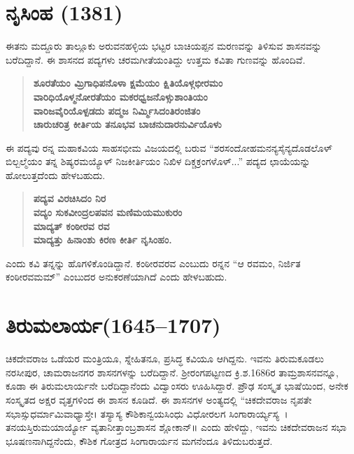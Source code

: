 \section{ನೃಸಿಂಹ (1381)}

ಈತನು ಮದ್ದೂರು ತಾಲ್ಲೂಕು ಅರುವನಹಳ್ಳಿಯ ಭಟ್ಟರ ಬಾಚಿಯಪ್ಪನ ಮರಣವನ್ನು ತಿಳಿಸುವ ಶಾಸನವನ್ನು ಬರೆದಿದ್ದಾನೆ. ಈ ಶಾಸನದ ಪದ್ಯಗಳು ಚರಮಗೀತೆಯಂತಿದ್ದು ಉತ್ತಮ ಕವಿತಾ ಗುಣವನ್ನು ಹೊಂದಿವೆ.

\begin{verse}
\textbf{ಶೂರತೆಯಂ ಮ್ರಿಗಾಧಿಪನೊಳಾ ಕ್ಷಮೆಯಂ ಕ್ಷಿತಿಯೊಳ್ಗಭೀರಮಂ} \\\textbf{ವಾರಿಧಿಯೊಳ್ಮನೋರತೆಯಂ ಮಕರಧ್ವಜನೊಳ್ಸುಶಾಂತಿಯಂ} \\\textbf{ವಾರಿಜವೈರಿಯೊಳ್ಪಡದು ಪದ್ಮಜ ನಿರ್ಮ್ಮಿಸಿದಂತಿರಂಜಿತಂ} \\\textbf{ಚಾರುಚರಿತ್ರ ಕೀರ್ತಿಯ ತನೂಭವ ಬಾಚನುದಾರನುರ್ವಿಯೊಳು}
\end{verse}

ಈ ಪದ್ಯವು ರನ್ನ ಮಹಾಕವಿಯ ಸಾಹಸಭೀಮ ವಿಜಯದಲ್ಲಿ ಬರುವ “ಶರಸಂದೋಹಮನನ್ಯಸೈನ್ಯದೊಡಲೊಳ್​ ಬಿಲ್ಬಲ್ಮೆಯಂ ತನ್ನ ಶಿಷ್ಯರಮಯ್ಯೊಳ್​ ನಿಜಕೀರ್ತಿಯಂ ನಿಖಿಳ ದಿಕ್ಚಕ್ರಂಗಳೊಳ್​...” ಪದ್ಯದ ಛಾಯೆಯನ್ನು ಹೋಲುತ್ತದೆಂದು ಹೇಳಬಹುದು.

\begin{verse}
\textbf{ಪದ್ಯವ ವಿರಚಿಸಿದಂ ನಿರ} \\\textbf{ವದ್ಯಂ ಸುಕವೀಂದ್ರಲಪವನ ಮಣಿಮಯಮುಕುರಂ} \\\textbf{ಮಾದ್ಯತ್​ ಕಂಠೀರವ ರವ} \\\textbf{ಮಾದ್ಯತ್ತು ಹಿನಾಂಶು ಕಿರಣ ಕೀರ್ತಿ ನೃಸಿಂಹಂ.}
\end{verse}

ಎಂದು ಕವಿ ತನ್ನನ್ನು ಹೊಗಳಿಕೊಂಡಿದ್ದಾನೆ. ಕಂಠೀರವರವ ಎಂಬುದು ರನ್ನನ “ಆ ರವಮಂ, ನಿರ್ಜಿತ ಕಂಠೀರವಮಮ್” ಎಂಬುದರ ಅನುಕರಣೆಯಾಗಿದೆ ಎಂದು ಹೇಳಬಹುದು.


\section{ತಿರುಮಲಾರ್ಯ(1645–1707)}

ಚಿಕದೇವರಾಜ ಒಡೆಯರ ಮಂತ್ರಿಯೂ, ಸ್ನೇಹಿತನೂ, ಪ್ರಸಿದ್ಧ ಕವಿಯೂ ಆಗಿದ್ದನು. ಇವನು ತಿರುಮಕೂಡಲು ನರಸೀಪುರ, ಚಾಮರಾಜನಗರ ಶಾಸನಗಳನ್ನು ಬರೆದಿದ್ದಾನೆ. ಶ‍್ರೀರಂಗಪಟ್ಟಣದ ಕ್ರಿ.ಶ.1686ರ ತಾಮ್ರಶಾಸನವನ್ನೂ, ಕೂಡಾ ಈ ತಿರುಮಲಾರ್ಯನೇ ಬರೆದಿದ್ದಾನೆಂದು ವಿದ್ವಾಂಸರು ಊಹಿಸಿದ್ದಾರೆ. ಪ್ರೌಢ ಸಂಸ್ಕೃತ ಭಾಷೆಯಿಂದ, ಅನೇಕ ಸಂಸ್ಕೃತದ ಅಕ್ಷರ ವೃತ್ತಗಳಿಂದ ಈ ಶಾಸನ ಕೂಡಿದೆ. ಈ ಶಾಸನಗಳ ಅಂತ್ಯದಲ್ಲಿ “ಚಿಕದೇವರಾಜ ನೃಪತೇ ಸಭಾಸ್ಸುಧರ್ಮಾಮಿವಾಧ್ಯಾಸ್ತೇ। ತಸ್ಯಾಸ್ಯ ಕೌಶಿಕಾನ್ವಯಸಿಂಧು ವಿಧೋರಲಗ ಸಿಂಗಾರಾರ್ಯ್ಯಸ್ಯ~। ತನಯಸ್ತಿರುಮಯಾರ್ಯ್ಯೋ ವ್ಯತಾನೀತ್ತಾಂಬ್ರಶಾಸನ ಶ್ಲೋಕಾನ್​॥ ಎಂದು ಹೇಳಿದ್ದು, ಇವನು ಚಿಕದೇವರಾಜನ ಸಭಾ ಭೂಷಣನಾಗಿದ್ದನೆಂದು, ಕೌಶಿಕ ಗೋತ್ರದ ಸಿಂಗಾರಾರ್ಯನ ಮಗನೆಂದೂ ತಿಳಿದುಬರುತ್ತದೆ. 

